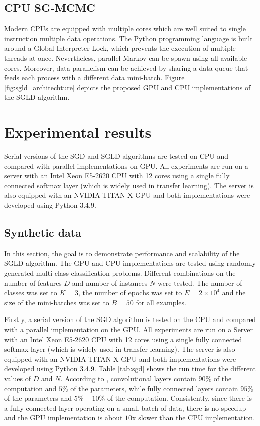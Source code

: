 \documentclass[conference]{IEEEtran}
\begin{document}
 
\subsection{CPU SG-MCMC}
Modern CPUs are equipped with multiple cores which are well suited to single instruction multiple data operations. The Python programming language is built around a Global Interpreter Lock, which prevents the execution of multiple threads at once.  Nevertheless, parallel Markov can be spawn using all available cores.  Moreover, data parallelism can be achieved by sharing a data queue that feeds each process with a different data mini-batch.  Figure \ref{fig:sgld_architechture} depicts the proposed GPU and CPU implementations of the SGLD algorithm. 


\section{Experimental results}
Serial versions of the SGD and SGLD algorithms are tested on CPU and compared with parallel
implementations on GPU. All experiments are run on a server with an Intel Xeon E5-2620 CPU
with 12 cores using a single fully connected softmax layer (which is widely used in transfer learning).
The server is also equipped with an NVIDIA TITAN X GPU and both implementations were developed
using Python 3.4.9.

\subsection{Synthetic data}
In this section, the goal is to demonstrate performance and scalability of the SGLD algorithm. The GPU and CPU implementations are tested using randomly generated multi-class classification problems. Different combinations on the number of features $D$ and number of instances $N$ were tested. The number of classes was set to $K=3$, the number of epochs was set to $E=2 \times 10^4$ and the size of the mini-batches was set to $B=50$ for all examples.

Firstly, a serial version  of the SGD algorithm is tested on the CPU and compared with a parallel implementation on the GPU. All experiments are run on a Server with an Intel Xeon E5-2620 CPU with 12 cores using a single fully connected softmax layer (which is widely used in transfer learning). The server is also equipped with an NVIDIA TITAN X GPU and both implementations were developed using Python 3.4.9. Table \ref{tab:sgd} shows the run time for the different values of $D$ and $N$. According to \cite{LI201695}, convolutional layers contain $90\%$ of the computation and $5\%$ of the parameters, while fully connected layers contain $95\%$ of the parameters and $5\%-10\%$ of the computation. Consistently, since there is a fully connected layer operating on a small batch of data, there is no speedup and the GPU implementation is about $10$x slower than the CPU implementation.
\end{document}
